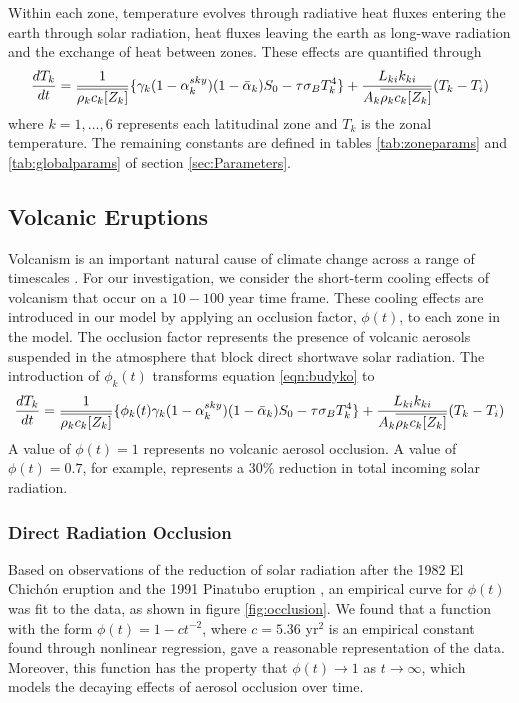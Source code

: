 \documentclass[12pt]{article}
\newcommand*\mean[1]{\overline{#1}}
\begin{document}
Within each zone, temperature evolves through radiative heat fluxes entering the
earth through solar radiation, heat fluxes leaving the earth as long-wave
radiation and the exchange of heat between zones. These effects are quantified
through
\begin{equation} \label{eqn:budyko}
    \frac{dT_k}{dt} = \frac{1}{\mean{\rho_kc_k[Z_k]}}
    \{
      \gamma_k(1-\alpha_k^{sky})(1-\Bar{\alpha}_k)S_0-\tau\sigma_BT_k^{4}
    \} +
    \frac{L_{ki}k_{ki}}{{A_k}\mean{\rho_kc_k[Z_k]}}(T_{k}-T_{i})
\end{equation}
where $k = 1,\dots,6$ represents each latitudinal zone and $T_k$ is the zonal
temperature. The remaining constants are defined in tables \ref{tab:zoneparams}
and \ref{tab:globalparams} of section \ref{sec:Parameters}.

\subsection{Volcanic Eruptions} \label{sec:Volcanos}
Volcanism is an important natural cause of climate change across a range of
timescales \parencite{robock}. For our investigation, we consider the
short-term cooling effects of volcanism that occur on a $10-100$ year time frame.
These cooling effects are introduced in our model by applying an occlusion factor,
$\phi(t)$, to each zone in the model. The
occlusion factor represents the presence of volcanic aerosols suspended in the
atmosphere that block direct shortwave solar radiation.
The introduction of $\phi_k(t)$
transforms equation \ref{eqn:budyko} to
\begin{equation} \label{eqn:occlusion}
\frac{dT_k}{dt} = \frac{1}{\mean{\rho_kc_k[Z_k]}}
\{
    \phi_k(t)\gamma_k(1-\alpha_k^{sky})(1-\Bar{\alpha}_k)S_0-\tau\sigma_BT_k^{4}
\} +
\frac{L_{ki}k_{ki}}{{A_k}\mean{\rho_kc_k[Z_k]}}(T_{k}-T_{i})
\end{equation}
A value of $\phi(t) = 1$ represents no volcanic aerosol occlusion. A value
of $\phi(t) = 0.7$, for example, represents a $30\%$ reduction in total
incoming solar radiation.

\subsubsection{Direct Radiation Occlusion} \label{sec:Occlusion}
Based on observations of the reduction of solar radiation after the
1982 El Chichón eruption and the 1991 Pinatubo eruption \parencite{robock},
an empirical curve for $\phi(t)$ was fit to the data, as shown
in figure \ref{fig:occlusion}. We found that a function with the form
$\phi(t) = 1 - ct^{-2}$, where $c=5.36$ yr$^2$ is an empirical constant found through
nonlinear regression, gave a reasonable representation of the data.
Moreover, this function has the property that $\phi(t) \to 1$ as $t \to \infty$,
which models the decaying effects of aerosol occlusion over time.
\end{document}
